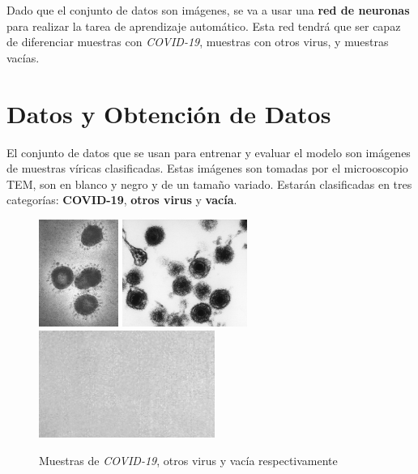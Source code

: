 \documentclass{uc3mpracticas}
\begin{document}
  \vspace{2mm}

  Dado que el conjunto de datos son imágenes, se va a usar una \textbf{red de neuronas} para realizar la tarea de aprendizaje automático. Esta red tendrá que ser capaz de diferenciar muestras con \textit{COVID-19}, muestras con otros virus, y muestras vacías.


  \section{Datos y Obtención de Datos}

  El conjunto de datos que se usan para entrenar y evaluar el modelo son imágenes de muestras víricas clasificadas. Estas imágenes son tomadas por el microoscopio TEM, son en blanco y negro y de un tamaño variado. Estarán clasificadas en tres categorías: \textbf{COVID-19}, \textbf{otros virus} y \textbf{vacía}.

  \vspace{5mm}

  \begin{figure}[!h]
    \centering
    \includegraphics[angle=90, width=0.3\linewidth, height=35mm, frame]{Images/coronaviridae/coronaviridae_0001.jpg}
    \hspace{4mm}
    \includegraphics[width=0.3\linewidth, height=35mm, frame]{Images/other/other_0020.jpg}
    \hspace{4mm}
    \includegraphics[width=0.3\linewidth, height=35mm, frame]{Images/blank/blank_0019.jpg}
    \caption{Muestras de \textit{COVID-19}, otros virus y vacía respectivamente}
  \end{figure}
\end{document}
